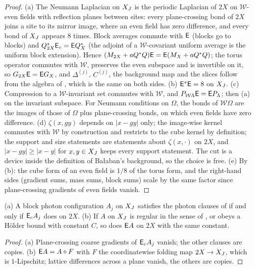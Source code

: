 \begin{proof}
(a) The Neumann Laplacian on $X_J$ is the periodic Laplacian of $2X$ on $\mathcal W$-even fields with reflection planes between sites: every plane-crossing bond of $2X$ joins a site to its mirror image, where an even field has zero difference, and every bond of $X_J$ appears $8$ times. Block averages commute with $\mathsf E$ (blocks go to blocks) and $Q^*_{2X}\mathsf E_c=\mathsf E Q^*_X$ (the adjoint of a $\mathcal W$-covariant uniform average is the uniform block extension). Hence $(M_{2X}+aQ^*Q)\mathsf E=\mathsf E(M_X+aQ^*Q)$; the torus operator commutes with $\mathcal W$, preserves the even subspace and is invertible on it, so $G_{2X}\mathsf E=\mathsf E G_X$, and $\Delta^{(j)}$, $C^{(j)}$, the background map and the slices follow from the algebra of \cite[(2.13)--(2.17)]{K1}, which is the same on both sides. (b) $\mathsf E^*\mathsf E=8$ on $X_J$. (c) Compression to a $\mathcal W$-invariant set commutes with $\mathcal W$, and $P_{\mathcal W\Lambda}\mathsf E=\mathsf E P_\Lambda$; then (a) on the invariant subspace. For Neumann conditions on $\Omega$, the bonds of $\mathcal W\Omega$ are the images of those of $\Omega$ plus plane-crossing bonds, on which even fields have zero difference. (d) $\zeta(x,gy)$ depends on $|x-gy|$ only; the image-wise kernel commutes with $\mathcal W$ by construction and restricts to the cube kernel by definition; the support and size statements are statements about $\zeta(x,\cdot)$ on $2X$, and $|x-gy|\ge|x-y|$ for $x,y\in X_J$ keeps every support statement. The cut is a device inside the definition of Ba{\l}aban's background, so the choice is free. (e) By (b): the cube form of an even field is $1/8$ of the torus form, and the right-hand sides (gradient sums, mass sums, block sums) scale by the same factor since plane-crossing gradients of even fields vanish.
\end{proof}

\begin{lemma}\label{lem:a01:REG}
(a) A block photon configuration $A_j$ on $X_J$ satisfies the photon clauses of \cite[(3.2)]{K1} if and only if $\mathsf E_cA_j$ does on $2X$. (b) If $A$ on $X_J$ is regular in the sense of \cite[(3.5)]{K1}, or obeys a H\"older bound with constant $C$, so does $\mathsf E A$ on $2X$ with the same constant.
\end{lemma}
\begin{proof}
(a) Plane-crossing coarse gradients of $\mathsf E_cA_j$ vanish; the other clauses are copies. (b) $\mathsf E A=A\circ F$ with $F$ the coordinatewise folding map $2X\to X_J$, which is $1$-Lipschitz; lattice differences across a plane vanish, the others are copies.
\end{proof}

